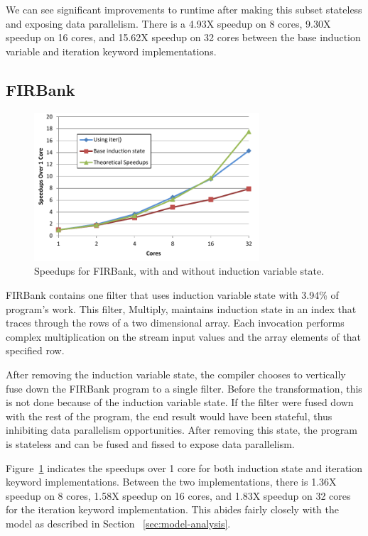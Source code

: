 We can see significant improvements to runtime after making this subset stateless and exposing data parallelism.  There is a 4.93X speedup on 8 cores, 9.30X speedup on 16 cores, and 15.62X speedup on 32 cores between the base induction variable and iteration keyword implementations.  

\subsection{FIRBank}
\begin{figure}[t]
\includegraphics[width=3.3in]{figures/firbank-results.pdf}
\caption{Speedups for FIRBank, with and without induction variable state.  \protect\label{fig:firbank-results}}
\end{figure}


FIRBank contains one filter that uses induction variable state
with 3.94\% of program's work. This filter, Multiply, maintains
induction state in an index that traces through the rows of a two
dimensional array. Each invocation performs complex multiplication on
the stream input values and the array elements of that specified row.

After removing the induction variable state, the compiler chooses to
vertically fuse down the FIRBank program to a single filter.
Before the transformation, this is not done because of the induction
variable state. If the filter were fused down with the rest of the
program, the end result would have been stateful, thus inhibiting data
parallelism opportunities. After removing this state, the program is
stateless and can be fused and fissed to expose data parallelism.

Figure~\ref{fig:firbank-results} indicates the speedups over 1 core
for both induction state and iteration keyword implementations.
Between the two implementations, there is 1.36X speedup on 8 cores,
1.58X speedup on 16 cores, and 1.83X speedup on 32 cores for the
iteration keyword implementation. This abides fairly closely with the
model as described in Section ~\ref{sec:model-analysis}.
